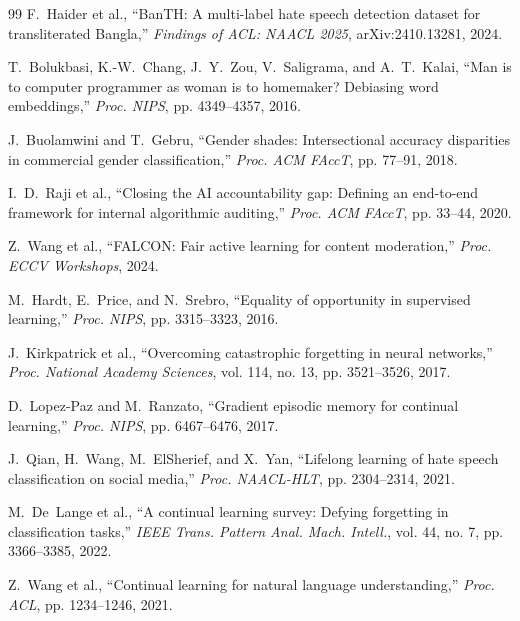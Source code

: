 \documentclass[conference]{IEEEtran}
\begin{document}
\begin{thebibliography}{99}
F.~Haider et al., ``BanTH: A multi-label hate speech detection dataset for transliterated Bangla,'' \textit{Findings of ACL: NAACL 2025}, arXiv:2410.13281, 2024.

T.~Bolukbasi, K.-W.~Chang, J.~Y.~Zou, V.~Saligrama, and A.~T.~Kalai, ``Man is to computer programmer as woman is to homemaker? Debiasing word embeddings,'' \textit{Proc. NIPS}, pp. 4349--4357, 2016.

J.~Buolamwini and T.~Gebru, ``Gender shades: Intersectional accuracy disparities in commercial gender classification,'' \textit{Proc. ACM FAccT}, pp. 77--91, 2018.

I.~D.~Raji et al., ``Closing the AI accountability gap: Defining an end-to-end framework for internal algorithmic auditing,'' \textit{Proc. ACM FAccT}, pp. 33--44, 2020.

Z.~Wang et al., ``FALCON: Fair active learning for content moderation,'' \textit{Proc. ECCV Workshops}, 2024.

M.~Hardt, E.~Price, and N.~Srebro, ``Equality of opportunity in supervised learning,'' \textit{Proc. NIPS}, pp. 3315--3323, 2016.

J.~Kirkpatrick et al., ``Overcoming catastrophic forgetting in neural networks,'' \textit{Proc. National Academy Sciences}, vol. 114, no. 13, pp. 3521--3526, 2017.

D.~Lopez-Paz and M.~Ranzato, ``Gradient episodic memory for continual learning,'' \textit{Proc. NIPS}, pp. 6467--6476, 2017.

J.~Qian, H.~Wang, M.~ElSherief, and X.~Yan, ``Lifelong learning of hate speech classification on social media,'' \textit{Proc. NAACL-HLT}, pp. 2304--2314, 2021.

M.~De~Lange et al., ``A continual learning survey: Defying forgetting in classification tasks,'' \textit{IEEE Trans. Pattern Anal. Mach. Intell.}, vol. 44, no. 7, pp. 3366--3385, 2022.

Z.~Wang et al., ``Continual learning for natural language understanding,'' \textit{Proc. ACL}, pp. 1234--1246, 2021.

\end{thebibliography}
\end{document}
